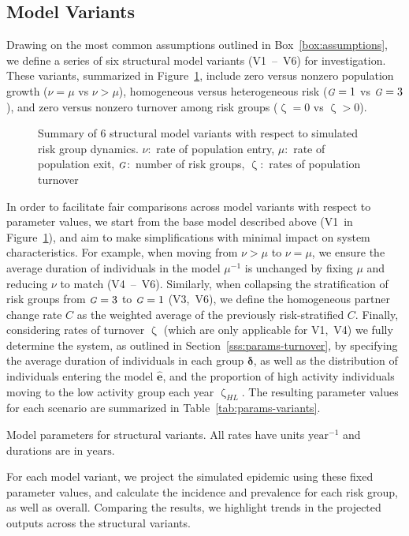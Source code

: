 \documentclass[10pt]{article}
\numberwithin{equation}{section}
\renewcommand{\zeta}{\upzeta}
\newcommand{\G}{{\mbox{\footnotesize{\textit{G}}}}}
\newcommand{\fig}[1]{Figure~\ref{#1}}
\newcommand{\tab}[1]{Table~\ref{#1}}
\begin{document}
\subsection{Model Variants}\label{ss:exp-variants}
Drawing on the most common assumptions outlined in Box~\ref{box:assumptions},
we define a series of six structural model variants (V1~--~V6) for investigation.
These variants, summarized in \fig{fig:variant-tree}, include
zero versus nonzero population growth ($\nu = \mu$ vs $\nu > \mu$),
homogeneous versus heterogeneous risk ($\G = 1$ vs $\G = 3$),
and zero versus nonzero turnover among risk groups ($\zeta = 0$ vs $\zeta > 0$).
\begin{figure}
  \centering
  \caption{Summary of 6 structural model variants with respect to simulated risk group dynamics.
    $\nu$:~rate of population entry,
    $\mu$:~rate of population exit,
    $\G$:~number of risk groups,
    $\zeta$:~rates of population turnover}
  \label{fig:variant-tree}
\end{figure}
\par
In order to facilitate fair comparisons across model variants with respect to parameter values,
we start from the base model described above (V1~in \fig{fig:variant-tree}),
and aim to make simplifications with minimal impact on system characteristics.
For example, when moving from $\nu > \mu$ to $\nu = \mu$,
we ensure the average duration of individuals in the model $\mu^{-1}$ is unchanged
by fixing $\mu$ and reducing $\nu$ to match (V4~--~V6).
Similarly, when collapsing the stratification of risk groups from $\G = 3$ to $\G = 1$ (V3,~V6),
we define the homogeneous partner change rate $C$
as the weighted average of the previously risk-stratified $C$.
Finally, considering rates of turnover $\zeta$
(which are only applicable for V1,~V4)
we fully determine the system, as outlined in Section~\ref{sss:params-turnover},
by specifying the average duration of individuals in each group $\bm{\delta}$,
as well as the distribution of individuals entering the model $\bm{\hat{e}}$,
and the proportion of high activity individuals moving to the low activity group each year $\zeta_{HL}$.
The resulting parameter values for each scenario
are summarized in \tab{tab:params-variants}.
\begin{table}
  \centering\caption{Model parameters for structural variants.
    All rates have units $\mathrm{year}^{-1}$ and durations are in $\mathrm{years}$.}
  \label{tab:params-variants}
  
\end{table}
\par
For each model variant,
we project the simulated epidemic using these fixed parameter values,
and calculate the incidence and prevalence for each risk group, as well as overall.
Comparing the results, we highlight trends in the projected outputs
across the structural variants.
\end{document}
